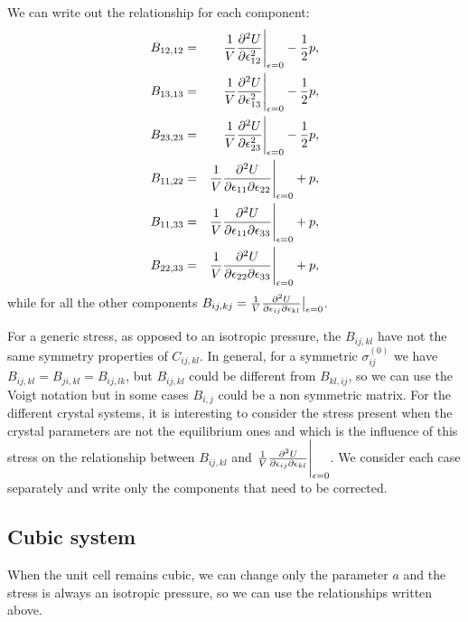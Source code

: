 \documentclass[12pt,a4paper]{article}
\begin{document}
We can write out the relationship for each component: 
\begin{eqnarray}
B_{12,12} &=& {1 \over V}{\partial^2 U \over \partial \epsilon^2_{12}}\Bigg|_{\epsilon=0} - {1\over 2} p, \\
B_{13,13} &=& {1 \over V}{\partial^2 U \over \partial \epsilon^2_{13} 
}\Bigg|_{\epsilon=0} - {1\over 2} p, \\
B_{23,23} &=& {1 \over V}{\partial^2 U \over \partial \epsilon^2_{23} 
}\Bigg|_{\epsilon=0} - {1\over 2} p, \\
B_{11,22} &=& {1 \over V}{\partial^2 U \over \partial \epsilon_{11} 
\partial \epsilon_{22}}\Bigg|_{\epsilon=0} + p, \\
B_{11,33} &=& {1 \over V}{\partial^2 U \over \partial \epsilon_{11} 
\partial \epsilon_{33}}\Bigg|_{\epsilon=0} + p, \\
B_{22,33} &=& {1 \over V}{\partial^2 U \over \partial \epsilon_{22} 
\partial \epsilon_{33}}\Bigg|_{\epsilon=0} + p, 
\end{eqnarray}
while for all the other components $B_{ij,kj}=
{1 \over V}{\partial^2 U \over \partial \epsilon_{ij} 
\partial \epsilon_{kl}}\big|_{\epsilon=0}$.

For a generic stress, as opposed to an isotropic pressure, the $B_{ij,kl}$ 
have not the same symmetry properties of $C_{ij,kl}$. In general, for a 
symmetric $\sigma^{(0)}_{ij}$ we have $B_{ij,kl}=B_{ji,kl}=B_{ij,lk}$,
but $B_{ij,kl}$ could be different from $B_{kl,ij}$, so we can use
the Voigt notation but in some cases $B_{i,j}$ could be a non symmetric
matrix.
For the different crystal systems, it is interesting to consider 
the stress present when the crystal parameters are not the equilibrium ones
and which is the influence of this stress on the relationship between 
$B_{ij,kl}$ and 
${1 \over V}{\partial^2 U \over \partial \epsilon_{ij} 
\partial \epsilon_{kl}}\Bigg|_{\epsilon=0}$. We consider each case
separately and write only the components that need to be corrected.

\subsection{\color{web-blue}Cubic system}
When the unit cell remains cubic, we can change only the parameter 
$a$ and the stress is always an isotropic pressure, so we can use the 
relationships written above.
\end{document}
